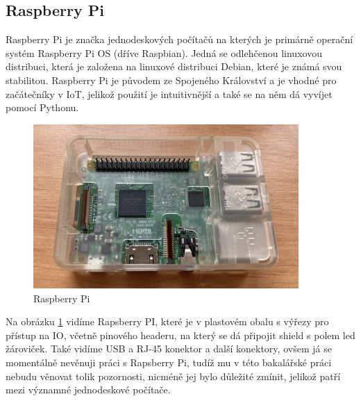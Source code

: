 
\subsection{Raspberry Pi}
Raspberry Pi je značka jednodeskových počítačů na kterých je primárně operační systém Raspberry Pi OS (dříve Raspbian). Jedná se odlehčenou linuxovou distribuci, která je založena na linuxové distribuci Debian, které je známá svou stabilitou. Raspberry Pi je původem ze Spojeného Království a je vhodné pro začátečníky v IoT, jelikož použití je intuitivnější a také se na něm dá vyvíjet pomocí Pythonu.
\begin{figure}[H]
	\centering
	\includegraphics[width=0.9\textwidth]{pictures/rasp.jpeg}
    	\caption{Raspberry Pi}
   	\label{fig:rasPI}
\end{figure}
Na obrázku \ref{fig:rasPI} vidíme Rapsberry PI, které je v plastovém obalu s výřezy pro přístup na IO, včetně pinového headeru, na který se dá připojit shield s polem led žároviček. Také vidíme USB a RJ-45 konektor a další konektory, ovšem já se momentálně nevěnuji práci s Rapsberry Pi, tudíž mu v této bakalářské práci nebudu věnovat tolik pozornosti, nicméně jej bylo důležité zmínit, jelikož patří mezi významné jednodeskové počítače.